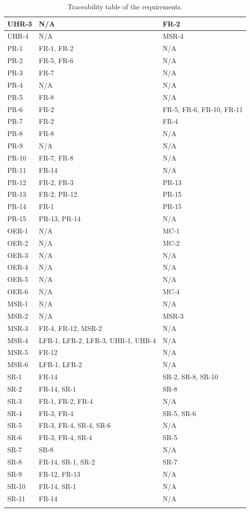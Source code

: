 \documentclass[12pt]{article}
\begin{document}
\begin{longtable}[c]{| m{3.4cm} | m{4cm} | m{5.3cm} |}
  UHR-3 & N/A & FR-2 \\ \hline
  UHR-4 & N/A & MSR-4 \\ \hline
  PR-1 & FR-1, FR-2 & N/A \\ \hline
  PR-2 & FR-5, FR-6 & N/A \\ \hline
  PR-3 & FR-7 & N/A \\ \hline
  PR-4 & N/A & N/A \\ \hline
  PR-5 & FR-8 & N/A \\ \hline
  PR-6 & FR-2 & FR-5, FR-6, FR-10, FR-11 \\ \hline
  PR-7 & FR-2 & FR-4 \\ \hline
  PR-8 & FR-8 & N/A \\ \hline
  PR-9 & N/A & N/A \\ \hline
  PR-10 & FR-7, FR-8 & N/A \\ \hline
  PR-11 & FR-14 & N/A \\ \hline
  PR-12 & FR-2, FR-3 & PR-13 \\ \hline
  PR-13 & FR-2, PR-12 & PR-15 \\ \hline
  PR-14 & FR-1 & PR-15 \\ \hline
  PR-15 & PR-13, PR-14 & N/A \\ \hline
  OER-1 & N/A & MC-1 \\ \hline
  OER-2 & N/A & MC-2 \\ \hline
  OER-3 & N/A & N/A \\ \hline
  OER-4 & N/A & N/A \\ \hline
  OER-5 & N/A & N/A \\ \hline
  OER-6 & N/A & MC-4 \\ \hline
  MSR-1 & N/A & N/A \\ \hline
  MSR-2 & N/A & MSR-3 \\ \hline
  MSR-3 & FR-4, FR-12, MSR-2 & N/A \\ \hline
  MSR-4 & LFR-1, LFR-2, LFR-3, UHR-1, UHR-4 & N/A \\ \hline
  MSR-5 & FR-12 & N/A \\ \hline
  MSR-6 & LFR-1, LFR-2 & N/A \\ \hline
  SR-1 & FR-14 & SR-2, SR-8, SR-10 \\ \hline
  SR-2 & FR-14, SR-1 & SR-8 \\ \hline
  SR-3 & FR-1, FR-2, FR-4 & N/A \\ \hline
  SR-4 & FR-3, FR-4 & SR-5, SR-6 \\ \hline
  SR-5 & FR-3, FR-4, SR-4, SR-6 & N/A \\ \hline
  SR-6 & FR-3, FR-4, SR-4 & SR-5 \\ \hline
  SR-7 & SR-8 & N/A \\ \hline
  SR-8 & FR-14, SR-1, SR-2 & SR-7 \\ \hline
  SR-9 & FR-12, FR-13 & N/A \\ \hline
  SR-10 & FR-14, SR-1 & N/A \\ \hline
  SR-11 & FR-14 & N/A \\ \hline
  \caption{Traceability table of the requirements.}
\end{longtable}
\end{document}
